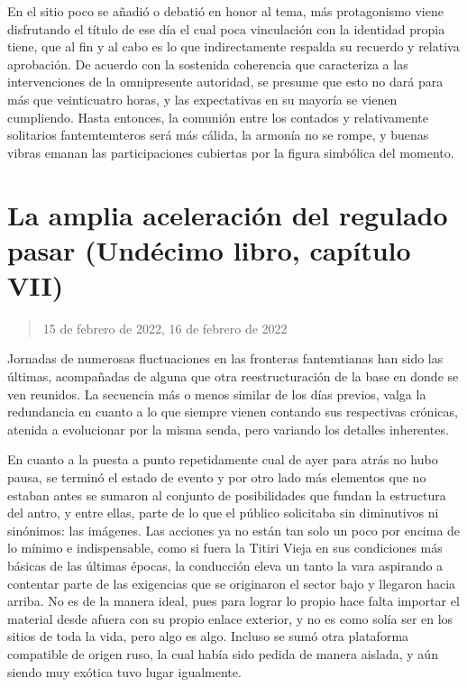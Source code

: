\documentclass[
]{book}
\begin{document}
En el sitio poco se añadió o debatió en honor al tema, más protagonismo viene disfrutando el título de ese día el cual poca vinculación con la identidad propia tiene, que al fin y al cabo es lo que indirectamente respalda su recuerdo y relativa aprobación. De acuerdo con la sostenida coherencia que caracteriza a las intervenciones de la omnipresente autoridad, se presume que esto no dará para más que veinticuatro horas, y las expectativas en su mayoría se vienen cumpliendo. Hasta entonces, la comunión entre los contados y relativamente solitarios fantemtemteros será más cálida, la armonía no se rompe, y buenas vibras emanan las participaciones cubiertas por la figura simbólica del momento.

\hypertarget{la-amplia-aceleraciuxf3n-del-regulado-pasar-unduxe9cimo-libro-capuxedtulo-vii}{%
\section{La amplia aceleración del regulado pasar (Undécimo libro, capítulo VII)}\label{la-amplia-aceleraciuxf3n-del-regulado-pasar-unduxe9cimo-libro-capuxedtulo-vii}}

\begin{quote}
15 de febrero de 2022, 16 de febrero de 2022
\end{quote}

Jornadas de numerosas fluctuaciones en las fronteras fantemtianas han sido las últimas, acompañadas de alguna que otra reestructuración de la base en donde se ven reunidos. La secuencia más o menos similar de los días previos, valga la redundancia en cuanto a lo que siempre vienen contando sus respectivas crónicas, atenida a evolucionar por la misma senda, pero variando los detalles inherentes.

En cuanto a la puesta a punto repetidamente cual de ayer para atrás no hubo pausa, se terminó el estado de evento y por otro lado más elementos que no estaban antes se sumaron al conjunto de posibilidades que fundan la estructura del antro, y entre ellas, parte de lo que el público solicitaba sin diminutivos ni sinónimos: las imágenes. Las acciones ya no están tan solo un poco por encima de lo mínimo e indispensable, como si fuera la Titiri Vieja en sus condiciones más básicas de las últimas épocas, la conducción eleva un tanto la vara aspirando a contentar parte de las exigencias que se originaron el sector bajo y llegaron hacia arriba. No es de la manera ideal, pues para lograr lo propio hace falta importar el material desde afuera con su propio enlace exterior, y no es como solía ser en los sitios de toda la vida, pero algo es algo. Incluso se sumó otra plataforma compatible de origen ruso, la cual había sido pedida de manera aislada, y aún siendo muy exótica tuvo lugar igualmente.
\end{document}
